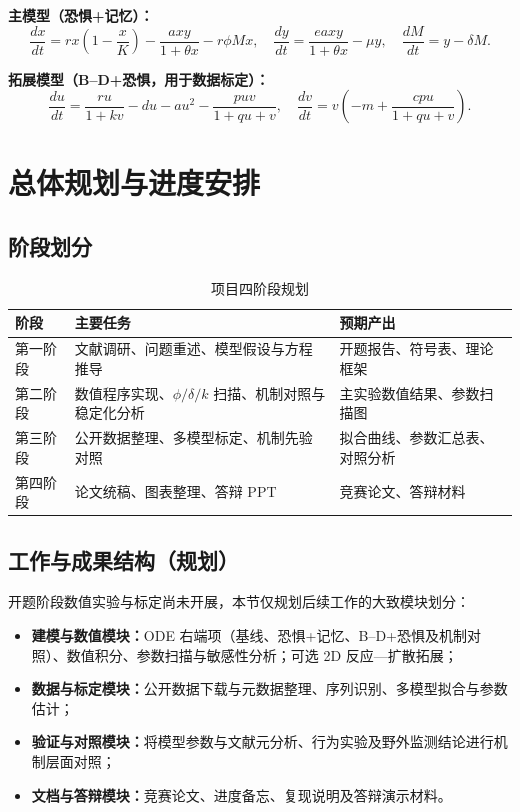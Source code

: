 \documentclass[12pt,a4paper]{ctexart}
\begin{document}
\textbf{主模型（恐惧+记忆）：}
\begin{equation*}
\frac{dx}{dt} = rx\left(1-\frac{x}{K}\right) - \frac{axy}{1+\theta x} - r\phi M x,\quad
\frac{dy}{dt} = \frac{eaxy}{1+\theta x} - \mu y,\quad
\frac{dM}{dt} = y - \delta M.
\end{equation*}

\textbf{拓展模型（B--D+恐惧，用于数据标定）：}
\begin{equation*}
\frac{du}{dt} = \frac{ru}{1+kv} - du - au^2 - \frac{puv}{1+qu+v},\quad
\frac{dv}{dt} = v\left(-m + \frac{cpu}{1+qu+v}\right).
\end{equation*}

\section{总体规划与进度安排}

\subsection{阶段划分}

\begin{table}[h]
  \centering
  \caption{项目四阶段规划}
  \small
  \begin{tabular}{p{2.2cm}p{5.2cm}p{6.2cm}}
    \toprule
    阶段 & 主要任务 & 预期产出 \\
    \midrule
    第一阶段 & 文献调研、问题重述、模型假设与方程推导 & 开题报告、符号表、理论框架 \\
    第二阶段 & 数值程序实现、$\phi/\delta/k$ 扫描、机制对照与稳定化分析 & 主实验数值结果、参数扫描图 \\
    第三阶段 & 公开数据整理、多模型标定、机制先验对照 & 拟合曲线、参数汇总表、对照分析 \\
    第四阶段 & 论文统稿、图表整理、答辩 PPT & 竞赛论文、答辩材料 \\
    \bottomrule
  \end{tabular}
\end{table}

\subsection{工作与成果结构（规划）}

开题阶段数值实验与标定尚未开展，本节仅规划后续工作的大致模块划分：

\begin{itemize}[leftmargin=2em]
  \item \textbf{建模与数值模块：}ODE 右端项（基线、恐惧+记忆、B--D+恐惧及机制对照）、数值积分、参数扫描与敏感性分析；可选 2D 反应—扩散拓展；
  \item \textbf{数据与标定模块：}公开数据下载与元数据整理、序列识别、多模型拟合与参数估计；
  \item \textbf{验证与对照模块：}将模型参数与文献元分析、行为实验及野外监测结论进行机制层面对照；
  \item \textbf{文档与答辩模块：}竞赛论文、进度备忘、复现说明及答辩演示材料。
\end{itemize}
\end{document}
